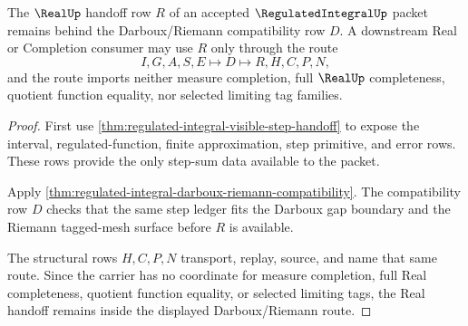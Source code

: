 \begin{theorem}
\label{thm:regulated-integral-real-completion-route}
The $\RealUp$ handoff row $R$ of an accepted $\RegulatedIntegralUp$ packet remains behind the Darboux/Riemann compatibility row $D$. A downstream Real or Completion consumer may use $R$ only through the route
$$
I,G,A,S,E \longmapsto D \longmapsto R,H,C,P,N ,
$$
and the route imports neither measure completion, full $\RealUp$ completeness, quotient function equality, nor selected limiting tag families.
\end{theorem}
\begin{proof}
First use \autoref{thm:regulated-integral-visible-step-handoff} to expose the interval, regulated-function, finite approximation, step primitive, and error rows. These rows provide the only step-sum data available to the packet.

Apply \autoref{thm:regulated-integral-darboux-riemann-compatibility}. The compatibility row $D$ checks that the same step ledger fits the Darboux gap boundary and the Riemann tagged-mesh surface before $R$ is available.

The structural rows $H,C,P,N$ transport, replay, source, and name that same route. Since the carrier has no coordinate for measure completion, full Real completeness, quotient function equality, or selected limiting tags, the Real handoff remains inside the displayed Darboux/Riemann route.
\end{proof}

